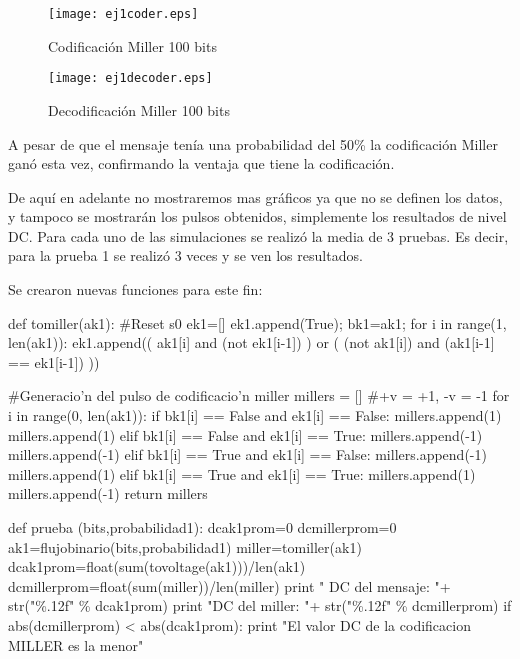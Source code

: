 \documentclass{article}
\begin{document}
\begin{figure}
  \centering
    \texttt{[image: ej1coder.eps]}
  \caption{Codificación Miller 100 bits}
  \label{fig:ej1coder}
\end{figure}

\begin{figure}
  \centering
    \texttt{[image: ej1decoder.eps]}
  \caption{Decodificación Miller 100 bits}
  \label{fig:ej1decoder}
\end{figure}

A pesar de que el mensaje tenía una probabilidad del 50\% la codificación Miller ganó esta vez, confirmando la ventaja que tiene la codificación.

De aquí en adelante no mostraremos mas gráficos ya que no se definen los datos, y tampoco se mostrarán los pulsos obtenidos, simplemente los resultados de nivel DC. Para cada uno de las simulaciones se realizó la media de 3 pruebas. Es decir, para la prueba 1 se realizó 3 veces y se ven los resultados.

Se crearon nuevas funciones para este fin:

\begin{python}
def tomiller(ak1):
    #Reset s0
    ek1=[]
    ek1.append(True);
    bk1=ak1;
    for i in range(1, len(ak1)):
        ek1.append(( ak1[i] and (not ek1[i-1]) ) or
            ( (not ak1[i]) and (ak1[i-1] == ek1[i-1]) ))
    
    #Generacio'n del pulso de codificacio'n miller
    millers = []
    #+v = +1, -v = -1
    for i in range(0, len(ak1)):
        if   bk1[i] == False and ek1[i] == False:
            millers.append(1)
            millers.append(1)
        elif bk1[i] == False and ek1[i] == True:
            millers.append(-1)
            millers.append(-1)
        elif bk1[i] == True  and ek1[i] == False:
            millers.append(-1)
            millers.append(1)
        elif bk1[i] == True  and ek1[i] == True:
            millers.append(1)
            millers.append(-1)
    return millers 

def prueba (bits,probabilidad1):
    dcak1prom=0
    dcmillerprom=0
    ak1=flujobinario(bits,probabilidad1)        
    miller=tomiller(ak1)
    dcak1prom=float(sum(tovoltage(ak1)))/len(ak1)
    dcmillerprom=float(sum(miller))/len(miller)
    print " DC del mensaje: "+ str("\%.12f" \% dcak1prom)
    print "DC del miller: "+ str("\%.12f" \% dcmillerprom)
    if abs(dcmillerprom) < abs(dcak1prom):
        print "El valor DC de la codificacion MILLER es la menor" 
\end{python}
\end{document}
